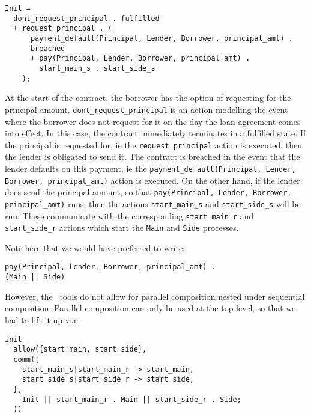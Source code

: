 \documentclass{article}
\begin{document}


\begin{lstlisting}
Init =
  dont_request_principal . fulfilled
  + request_principal . (
      payment_default(Principal, Lender, Borrower, principal_amt) .
      breached
      + pay(Principal, Lender, Borrower, principal_amt) .
        start_main_s . start_side_s
    );
\end{lstlisting}

At the start of the contract, the borrower has the option of requesting for
the principal amount.
\texttt{dont\_request\_principal} is an action modelling the event where the
borrower does not request for it on the day the loan agreement comes into
effect.
In this case, the contract immediately terminates in a fulfilled state.
If the principal is requested for, ie the \texttt{request\_principal} action
is executed, then the lender is obligated to send it.
The contract is breached in the event that the lender defaults on this payment,
ie the \texttt{payment\_default(Principal, Lender, Borrower, principal\_amt)}
action is executed.
On the other hand, if the lender does send the principal amount,
so that \texttt{pay(Principal, Lender, Borrower, principal\_amt)} runs,
then the actions \texttt{start\_main\_s} and \texttt{start\_side\_s} will be run.
These communicate with the corresponding \texttt{start\_main\_r} and
\texttt{start\_side\_r} actions which start the \texttt{Main} and
\texttt{Side} processes.

Note here that we would have preferred to write:

\begin{lstlisting}
pay(Principal, Lender, Borrower, principal_amt) .
(Main || Side)
\end{lstlisting}

However, the \mcrl \, tools do not allow for parallel composition nested under
sequential composition.
Parallel composition can only be used at the top-level, so that we had to lift
it up via:

\begin{lstlisting}[label=init1, caption=Top-level process version 1]
init
  allow({start_main, start_side},
  comm({
    start_main_s|start_main_r -> start_main,
    start_side_s|start_side_r -> start_side,
  },
    Init || start_main_r . Main || start_side_r . Side;
  ))
\end{lstlisting}
\end{document}
